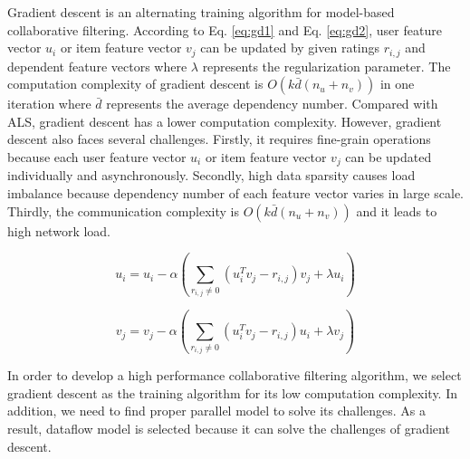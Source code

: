 \documentclass{llncs}
\begin{document}
Gradient descent is an alternating training algorithm for model-based collaborative filtering. According to Eq. \ref{eq:gd1} and Eq. \ref{eq:gd2},
user feature vector $u_i$ or item feature vector $v_j$ can be updated by given ratings $r_{i,j}$ and dependent feature vectors where $\lambda$ represents the regularization parameter. The computation complexity of gradient descent is $O(k\bar{d}(n_u + n_v))$ in one iteration where $\bar{d}$ represents the average dependency number. Compared with ALS, gradient descent has a lower computation complexity. However, gradient descent also faces several challenges. Firstly, it requires fine-grain operations because each user feature vector $u_i$ or item feature vector $v_j$ can be updated individually and asynchronously. Secondly, high data sparsity causes load imbalance because dependency number of each feature vector varies in large scale. Thirdly, the communication complexity is $O(k\bar{d}(n_u + n_v))$ and it leads to high network load.
\vspace{-5pt}

\begin{equation}
\label{eq:gd1}
  u_i = u_i - \alpha (\sum_{r_{i,j} \neq 0}(u_i^Tv_j - r_{i,j})v_j + \lambda u_i)
\end{equation}
\vspace{-15pt}

\begin{equation}
\label{eq:gd2}
v_j = v_j - \alpha (\sum_{r_{i,j} \neq 0}(u^T_iv_j - r_{i,j})u_i + \lambda v_j)
\end{equation}
\vspace{-10pt}

In order to develop a high performance collaborative filtering algorithm, we select gradient descent as the training algorithm for its low computation complexity. In addition, we need to find proper parallel model to solve its challenges. As a result, dataflow model is selected because it can solve the challenges of gradient descent.
%
\end{document}
